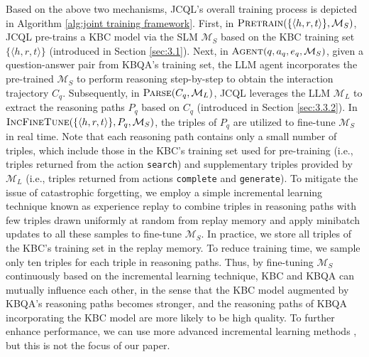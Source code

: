 \documentclass[11pt]{article}
\begin{document}
Based on the above two mechanisms, JCQL's overall training process is depicted in Algorithm \ref{alg:joint training framework}. First, in $\textsc{Pretrain}(\{\langle h,r,t \rangle\}, \mathcal{M}_S)$, JCQL pre-trains a KBC model via the SLM $\mathcal{M}_S$ based on the KBC training set $\{\langle h,r,t\rangle\}$ (introduced in Section \ref{sec:3.1}). Next, in $\textsc{Agent}(q,a_q,e_q,\mathcal{M}_S)$, given a question-answer pair from KBQA's training set, the LLM agent incorporates the pre-trained $\mathcal{M}_S$ to perform reasoning step-by-step to obtain the interaction trajectory $C_q$. Subsequently, in $\textsc{Parse}(C_q,\mathcal{M}_L)$, JCQL leverages the LLM $\mathcal{M}_L$ to extract the reasoning paths $P_q$ based on $C_q$ (introduced in Section \ref{sec:3.3.2}). In $\textsc{IncFineTune}(\{\langle h,r,t\rangle\},P_q,\mathcal{M}_S)$, the triples of $P_q$ are utilized to fine-tune $\mathcal{M}_S$ in real time. Note that each reasoning path contains only a small number of triples, which include those in the KBC's training set used for pre-training (i.e., triples returned from the action \texttt{search}) and supplementary triples provided by $\mathcal{M}_L$ (i.e., triples returned from actions \texttt{complete} and \texttt{generate}). 
To mitigate the issue of catastrophic forgetting, we employ a simple incremental learning technique known as experience replay \cite{DQN} to combine triples in reasoning paths with few triples drawn uniformly at random from replay memory and apply minibatch updates to all these samples to fine-tune $\mathcal{M}_S$. In practice, we store all triples of the KBC's training set in the replay memory.
To reduce training time, we sample only ten triples for each triple in reasoning paths. Thus, by fine-tuning $\mathcal{M}_S$ continuously based on the incremental learning technique, KBC and KBQA can mutually influence each other, in the sense that the KBC model augmented by KBQA's reasoning paths becomes stronger, and the reasoning paths of KBQA incorporating the KBC model are more likely to be high quality. 
To further enhance performance, we can use more advanced incremental learning methods \cite{Incremental_Learning1}, but this is not the focus of our paper. 
\end{document}
